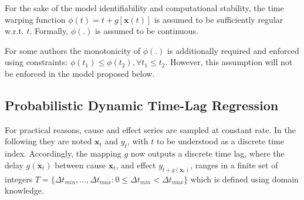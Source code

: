 For the sake of the model identifiability and computational stability, the 
time warping function $\phi(t) = t + g[\mathbf{x}(t)]$ is assumed to be sufficiently 
regular w.r.t. $t$. Formally,  $\phi(.)$ is assumed to be continuous.

For some authors \citep{ZHOU2006195} the monotonicity of $\phi(.)$ is 
additionally required and enforced using constraints: 
$\phi(t_1) \leq \phi(t_2), \forall t_1 \leq t_2$. However, this assumption will 
not be enforced in the model proposed below. 

\subsection{Probabilistic Dynamic Time-Lag Regression}

For practical reasons, cause and effect series are sampled at constant rate. In 
the following they are noted  ${\mathbf{x}_t}$ and ${y_t}$, with $t$ to be understood 
as a discrete time index. Accordingly, the mapping $g$ now outputs a discrete 
time lag, where the delay $g(\mathbf{x}_t)$ between cause $\mathbf{x}_t$, and effect 
$y_{t+g(\mathbf{x}_t)}$, ranges in a finite set of integers 
$T = \{\Delta t_{min}, \ldots, \Delta t_{max}: 0 \le \Delta t_{min} < \Delta t_{max}\}$ 
which is defined using domain knowledge.

